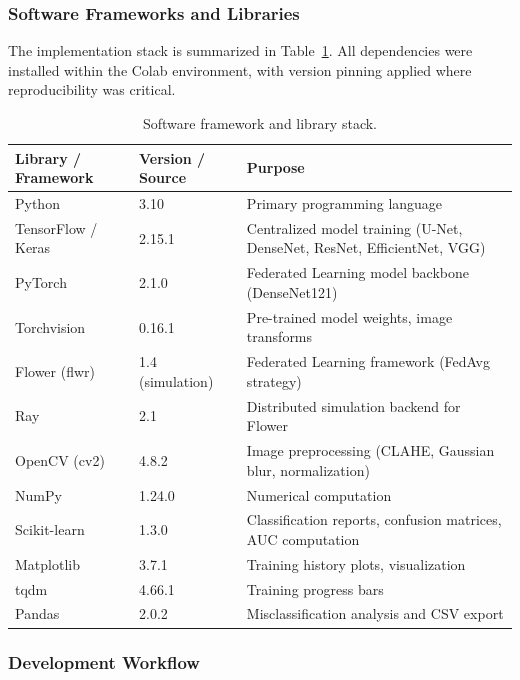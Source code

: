 \subsubsection{Software Frameworks and Libraries}

The implementation stack is summarized in Table~\ref{tab:chest_software}. All dependencies were installed within the Colab environment, with version pinning applied where reproducibility was critical.

\begin{table}[htbp]
	\centering
	\caption{Software framework and library stack.}
	\label{tab:chest_software}
	\small
	\begin{tabularx}{\textwidth}{|l|l|X|}
		\hline
		\textbf{Library / Framework} & \textbf{Version / Source} & \textbf{Purpose} \\
		\hline
		Python & 3.10 & Primary programming language \\
		\hline
		TensorFlow / Keras & 2.15.1 & Centralized model training (U-Net, DenseNet, ResNet, EfficientNet, VGG) \\
		\hline
		PyTorch & 2.1.0 & Federated Learning model backbone (DenseNet121) \\
		\hline
		Torchvision & 0.16.1 & Pre-trained model weights, image transforms \\
		\hline
		Flower (flwr) & 1.4 (simulation) & Federated Learning framework (FedAvg strategy) \\
		\hline
		Ray & 2.1 & Distributed simulation backend for Flower \\
		\hline
		OpenCV (cv2) & 4.8.2 & Image preprocessing (CLAHE, Gaussian blur, normalization) \\
		\hline
		NumPy & 1.24.0 & Numerical computation \\
		\hline
		Scikit-learn & 1.3.0 & Classification reports, confusion matrices, AUC computation \\
		\hline
		Matplotlib & 3.7.1 & Training history plots, visualization \\
		\hline
		tqdm & 4.66.1 & Training progress bars \\
		\hline
		Pandas & 2.0.2 & Misclassification analysis and CSV export \\
		\hline
	\end{tabularx}
\end{table}

\subsubsection{Development Workflow}

